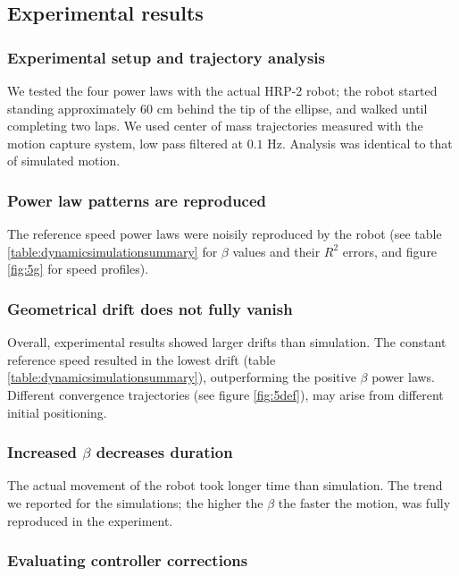 
\subsection{Experimental results}
\subsubsection{Experimental setup and trajectory analysis}
We tested the four power laws with the actual HRP-2 robot; the robot started standing approximately $60$ cm behind the tip of the ellipse, and walked until completing two laps. We used center of mass trajectories measured with the motion capture system, low pass filtered at $0.1$ Hz.  Analysis was identical to that of simulated motion.  


\subsubsection{Power law patterns are reproduced}
The reference speed power laws were noisily reproduced by the robot (see table \ref{table:dynamicsimulationsummary} for $\beta$ values and their $R^2$ errors, and figure \ref{fig:5g} for speed profiles). 

\subsubsection{Geometrical drift does not fully vanish}
Overall, experimental results showed larger drifts than simulation. The constant reference speed resulted in the lowest drift (table \ref{table:dynamicsimulationsummary}), outperforming the positive $\beta$ power laws. Different convergence trajectories (see figure \ref{fig:5def}), may arise from different initial positioning. 
 
\subsubsection{Increased $\beta$ decreases duration}
The actual movement of the robot took longer time than simulation. The trend we reported for the simulations; the higher the $\beta$ the faster the motion, was fully reproduced in the experiment.

\subsubsection{Evaluating controller corrections}

